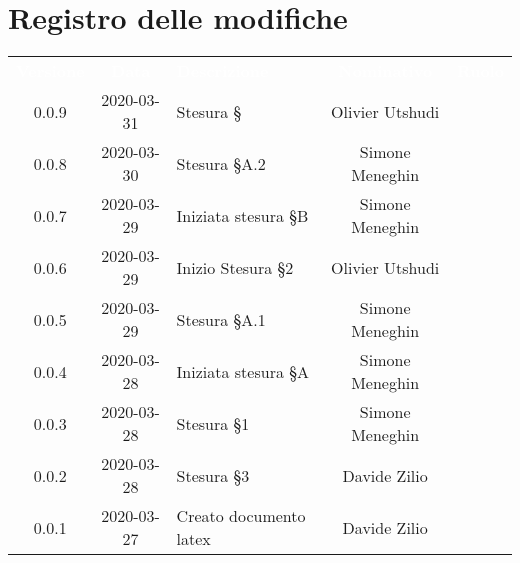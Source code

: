 \section*{Registro delle modifiche}
{
	\centering
	\begin{longtable}{ c c  C{4cm}  c  c }
		\textcolor{white}{\textbf{Versione}} & \textcolor{white}{\textbf{Data}} & \textcolor{white}{\textbf{Descrizione}} & \textcolor{white}{\textbf{Nominativo}} & \textcolor{white}{\textbf{Ruolo}}\\		
		0.0.9 & 2020-03-31 & Stesura \S  & Olivier Utshudi &\reda{} \\
		0.0.8 & 2020-03-30 & Stesura \S A.2 & Simone Meneghin &\reda{} \\
		0.0.7 & 2020-03-29 & Iniziata stesura \S B & Simone Meneghin &\reda{} \\
		0.0.6 & 2020-03-29 & Inizio Stesura \S 2 & Olivier Utshudi &\reda{} \\
		0.0.5 & 2020-03-29 & Stesura \S A.1 & Simone Meneghin &\reda{} \\
		0.0.4 & 2020-03-28 & Iniziata stesura \S A & Simone Meneghin &\reda{} \\
		0.0.3 & 2020-03-28 & Stesura \S 1 & Simone Meneghin &\reda{} \\
		0.0.2 & 2020-03-28 & Stesura \S 3 & Davide Zilio &\reda{} \\
		0.0.1 & 2020-03-27 & Creato documento latex & Davide Zilio &\reda{}\\		
		
	\end{longtable}

}